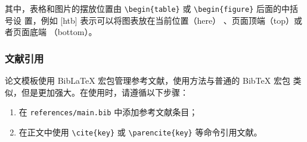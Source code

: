 其中，表格和图片的摆放位置由 \verb|\begin{table}| 或 \verb|\begin{figure}| 后面的中括号设
置，例如 [htb] 表示可以将图表放在当前位置（here）
、页面顶端（top）或者页面底端
（bottom）。

\subsubsection{文献引用}

\BIThesis 论文模板使用 BibLaTeX 宏包管理参考文献，使用方法与普通的 BibTeX 宏包
类似，但是更加强大。在使用时，请遵循以下步骤：
\begin{enumerate}
  \item 在 \texttt{references/main.bib} 中添加参考文献条目；
  \item 在正文中使用 \verb|\cite{key}| 或 \verb|\parencite{key}| 等命令引用文献。
\end{enumerate}


